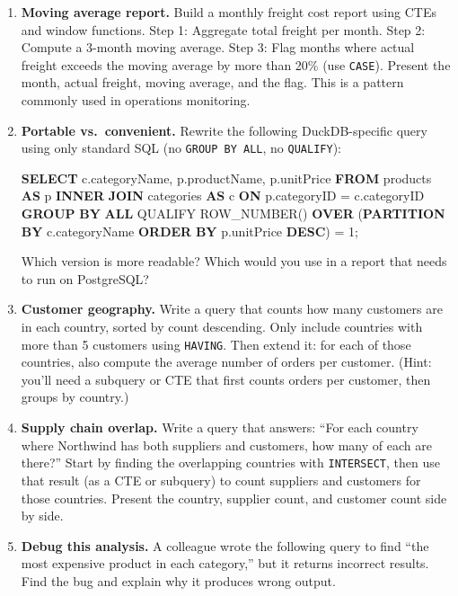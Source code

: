 \documentclass[
  letterpaper,
  DIV=11,
  numbers=noendperiod]{scrreprt}
\newenvironment{Shaded}{\begin{snugshade}}{\end{snugshade}}
\newcommand{\DecValTok}[1]{\textcolor[rgb]{0.68,0.00,0.00}{#1}}
\newcommand{\FunctionTok}[1]{\textcolor[rgb]{0.28,0.35,0.67}{#1}}
\newcommand{\KeywordTok}[1]{\textcolor[rgb]{0.00,0.23,0.31}{\textbf{#1}}}
\newcommand{\NormalTok}[1]{\textcolor[rgb]{0.00,0.23,0.31}{#1}}
\newcommand{\OperatorTok}[1]{\textcolor[rgb]{0.37,0.37,0.37}{#1}}
\begin{document}
\begin{enumerate}
\begin{codelisting}
  \end{codelisting}
\item
  \textbf{Moving average report.} Build a monthly freight cost report
  using CTEs and window functions. Step 1: Aggregate total freight per
  month. Step 2: Compute a 3-month moving average. Step 3: Flag months
  where actual freight exceeds the moving average by more than 20\% (use
  \texttt{CASE}). Present the month, actual freight, moving average, and
  the flag. This is a pattern commonly used in operations monitoring.
\item
  \textbf{Portable vs.~convenient.} Rewrite the following
  DuckDB-specific query using only standard SQL (no
  \texttt{GROUP\ BY\ ALL}, no \texttt{QUALIFY}):

  \begin{codelisting}

  \caption{\texttt{duckdb}}

\begin{Shaded}
\begin{Highlighting}[]
\KeywordTok{SELECT}
\NormalTok{    c.categoryName,}
\NormalTok{    p.productName,}
\NormalTok{    p.unitPrice}
\KeywordTok{FROM}\NormalTok{ products }\KeywordTok{AS}\NormalTok{ p}
\KeywordTok{INNER} \KeywordTok{JOIN}\NormalTok{ categories }\KeywordTok{AS}\NormalTok{ c }\KeywordTok{ON}\NormalTok{ p.categoryID }\OperatorTok{=}\NormalTok{ c.categoryID}
\KeywordTok{GROUP} \KeywordTok{BY} \KeywordTok{ALL}
\NormalTok{QUALIFY }\FunctionTok{ROW\_NUMBER}\NormalTok{() }\KeywordTok{OVER}\NormalTok{ (}\KeywordTok{PARTITION} \KeywordTok{BY}\NormalTok{ c.categoryName }\KeywordTok{ORDER} \KeywordTok{BY}\NormalTok{ p.unitPrice }\KeywordTok{DESC}\NormalTok{) }\OperatorTok{=} \DecValTok{1}\NormalTok{;}
\end{Highlighting}
\end{Shaded}

  \end{codelisting}

  Which version is more readable? Which would you use in a report that
  needs to run on PostgreSQL?
\item
  \textbf{Customer geography.} Write a query that counts how many
  customers are in each country, sorted by count descending. Only
  include countries with more than 5 customers using \texttt{HAVING}.
  Then extend it: for each of those countries, also compute the average
  number of orders per customer. (Hint: you'll need a subquery or CTE
  that first counts orders per customer, then groups by country.)
\item
  \textbf{Supply chain overlap.} Write a query that answers: ``For each
  country where Northwind has both suppliers and customers, how many of
  each are there?'' Start by finding the overlapping countries with
  \texttt{INTERSECT}, then use that result (as a CTE or subquery) to
  count suppliers and customers for those countries. Present the
  country, supplier count, and customer count side by side.
\item
  \textbf{Debug this analysis.} A colleague wrote the following query to
  find ``the most expensive product in each category,'' but it returns
  incorrect results. Find the bug and explain why it produces wrong
  output.


\end{enumerate}
\end{document}

